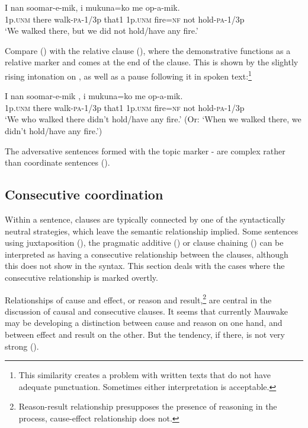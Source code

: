 \ea%
\label{ex:x1394}
\gll I  nan  soomar-e-mik,    i  mukuna=ko  me op-a-mik.\\
1p.\textsc{unm}  there  walk-\textsc{pa}-1/3p  that1  1p.\textsc{unm}  fire=\textsc{nf} not hold-\textsc{pa}-1/3p     \\
\glt`We walked there, but we did not hold/have any fire.'
\z


Compare () with the relative clause (), where the demonstrative functions as a relative marker and comes at the end of the clause. This is shown by the slightly rising intonation on , as well as a pause following it in spoken text:\footnote{This similarity creates a problem with written texts that do not have adequate punctuation. Sometimes either interpretation is acceptable.} 

\ea%
\label{ex:x1396}
\gll I  nan  soomar-e-mik ,  i  mukuna=ko  me op-a-mik.\\
1p.\textsc{unm}  there  walk-\textsc{pa}-1/3p that1  1p.\textsc{unm}  fire=\textsc{nf}  not hold-\textsc{pa}-1/3p\\
\glt`We who walked there didn't hold/have any fire.' (Or: `When we walked there, we didn't hold/have any fire.')
\z

The adversative sentences formed with the topic marker - are complex rather than coordinate sentences ().

\subsection{Consecutive coordination}

Within a sentence, clauses are typically connected by one of the syntactically neutral strategies, which leave the semantic relationship implied. Some sentences using juxtaposition (), the pragmatic additive  () or clause chaining () can be interpreted as having a consecutive relationship between the clauses, although this does not show in the syntax. This section deals with the cases where the consecutive relationship is marked overtly.

Relationships of cause and effect, or reason and result,\footnote{Reason-result relationship presupposes the presence of reasoning in the process, cause-effect relationship does not.}  are central in the discussion of causal and consecutive clauses. It seems that currently Mauwake may be developing a distinction between cause and reason on one hand, and between effect and result on the other. But the tendency, if there, is not very strong (). 

